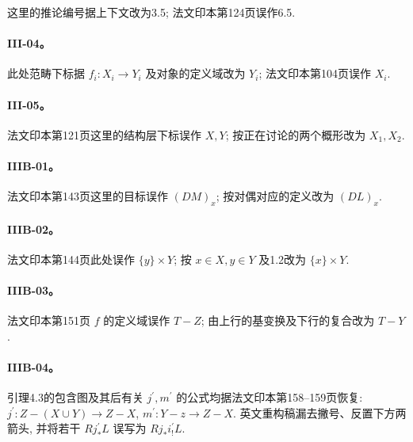 这里的推论编号据上下文改为3.5; 法文印本第124页误作6.5.

\hypertarget{collation-III-04}{}

\paragraph*{III-04。}

此处范畴下标据 $f_i:X_i\to Y_i$ 及对象的定义域改为 $Y_i$; 法文印本第104页误作 $X_i$.

\hypertarget{collation-III-05}{}

\paragraph*{III-05。}

法文印本第121页这里的结构层下标误作 $X,Y$; 按正在讨论的两个概形改为 $X_1,X_2$.

\hypertarget{collation-IIIB-01}{}

\paragraph*{IIIB-01。}

法文印本第143页这里的目标误作 $(DM)_x$; 按对偶对应的定义改为 $(DL)_x$.

\hypertarget{collation-IIIB-02}{}

\paragraph*{IIIB-02。}

法文印本第144页此处误作 $\{y\}\times Y$; 按 $x\in X,y\in Y$ 及1.2改为 $\{x\}\times Y$.

\hypertarget{collation-IIIB-03}{}

\paragraph*{IIIB-03。}

法文印本第151页 $f$ 的定义域误作 $T-Z$; 由上行的基变换及下行的复合改为 $T-Y$.

\hypertarget{collation-IIIB-04}{}

\paragraph*{IIIB-04。}

引理4.3的包含图及其后有关 $j^\prime,m^\prime$ 的公式均据法文印本第158--159页恢复: $j^\prime:Z-(X\cup Y)\to Z-X$, $m^\prime:Y-z\to Z-X$. 英文重构稿漏去撇号、反置下方两箭头, 并将若干 $Rj^\prime_*L$ 误写为 $Rj_*i^\prime_!L$.

